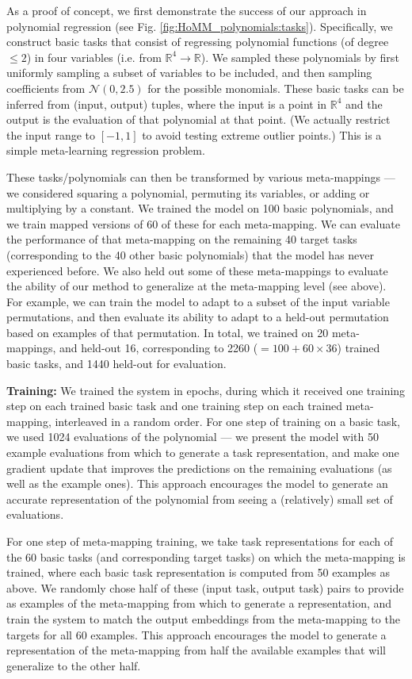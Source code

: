 As a proof of concept, we first demonstrate the success of our approach in polynomial regression (see Fig. \ref{fig:HoMM_polynomials:tasks}). Specifically, we construct basic tasks that consist of regressing polynomial functions (of degree \(\leq 2\)) in four variables (i.e. from \(\mathbb{R}^4 \rightarrow \mathbb{R}\)). We sampled these polynomials by first uniformly sampling a subset of variables to be included, and then sampling coefficients from \(\mathcal{N}(0, 2.5)\) for the possible monomials. These basic tasks can be inferred from (input, output) tuples, where the input is a point in \(\mathbb{R}^4\) and the output is the evaluation of that polynomial at that point. (We actually restrict the input range to \([-1, 1]\) to avoid testing extreme outlier points.) This is a simple meta-learning regression problem. 

These tasks/polynomials can then be transformed by various meta-mappings --- we considered squaring a polynomial, permuting its variables, or adding or multiplying by a constant. We trained the model on 100 basic polynomials, and we train mapped versions of 60 of these for each meta-mapping. We can evaluate the performance of that meta-mapping on the remaining 40 target tasks (corresponding to the 40 other basic polynomials) that the model has never experienced before. We also held out some of these meta-mappings to evaluate the ability of our method to generalize at the meta-mapping level (see above). For example, we can train the model to adapt to a subset of the input variable permutations, and then evaluate its ability to adapt to a held-out permutation based on examples of that permutation. In total, we trained on 20 meta-mappings, and held-out 16, corresponding to 2260 (\(=100 + 60 \times 36 \)) trained basic tasks, and 1440 held-out for evaluation. 

\textbf{Training:} We trained the system in epochs, during which it received one training step on each trained basic task and one training step on each trained meta-mapping, interleaved in a random order. For one step of training on a basic task, we used 1024 evaluations of the polynomial --- we present the model with 50 example evaluations from which to generate a task representation, and make one gradient update that improves the predictions on the remaining evaluations (as well as the example ones). This approach encourages the model to generate an accurate representation of the polynomial from seeing a (relatively) small set of evaluations. 

For one step of meta-mapping training, we take task representations for each of the 60 basic tasks (and corresponding target tasks) on which the meta-mapping is trained, where each basic task representation is computed from 50 examples as above. We randomly chose half of these (input task, output task) pairs to provide as examples of the meta-mapping from which to generate a representation, and train the system to match the output embeddings from the meta-mapping to the targets for all 60 examples. This approach encourages the model to generate a representation of the meta-mapping from half the available examples that will generalize to the other half.

